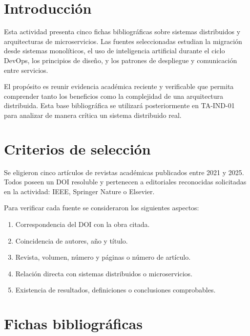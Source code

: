 \documentclass[12pt,a4paper]{article}
\begin{document}
\section{Introducci\'on}

Esta actividad presenta cinco fichas bibliogr\'aficas sobre sistemas distribuidos y arquitecturas de microservicios. Las fuentes seleccionadas estudian la migraci\'on desde sistemas monol\'iticos, el uso de inteligencia artificial durante el ciclo DevOps, los principios de dise\~no, y los patrones de despliegue y comunicaci\'on entre servicios.

El prop\'osito es reunir evidencia acad\'emica reciente y verificable que permita comprender tanto los beneficios como la complejidad de una arquitectura distribuida. Esta base bibliogr\'afica se utilizar\'a posteriormente en TA-IND-01 para analizar de manera cr\'itica un sistema distribuido real.

\section{Criterios de selecci\'on}

Se eligieron cinco art\'iculos de revistas acad\'emicas publicados entre 2021 y 2025. Todos poseen un DOI resoluble y pertenecen a editoriales reconocidas solicitadas en la actividad: IEEE, Springer Nature o Elsevier.

Para verificar cada fuente se consideraron los siguientes aspectos:

\begin{enumerate}[nosep]
  \item Correspondencia del DOI con la obra citada.
  \item Coincidencia de autores, a\~no y t\'itulo.
  \item Revista, volumen, n\'umero y p\'aginas o n\'umero de art\'iculo.
  \item Relaci\'on directa con sistemas distribuidos o microservicios.
  \item Existencia de resultados, definiciones o conclusiones comprobables.
\end{enumerate}

\section{Fichas bibliogr\'aficas}
\end{document}
